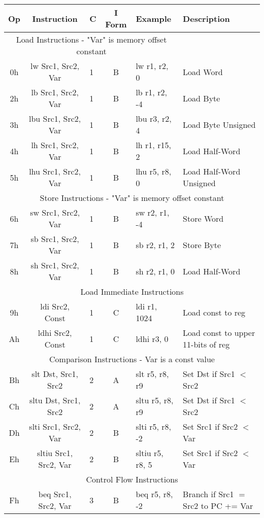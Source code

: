 \documentclass[]{article}
\begin{document}
\begin{longtable}{|c|c|l|c|l|p{5cm}|}
	\hline
	Op & Instruction & C & I Form & Example & Description \\
	\hline
	\multicolumn{5}{|c|}{Load Instructions - "Var" is memory offset constant} \\
	\hline
	0h & lw Src1, Src2, Var & 1 & B & lw r1, r2, 0 & Load Word \\
	\hline
	2h & lb Src1, Src2, Var & 1 & B & lb r1, r2, -4 & Load Byte\\
	\hline
	3h & lbu Src1, Src2, Var & 1 & B & lbu r3, r2, 4 & Load Byte Unsigned \\
	\hline
	4h & lh Src1, Src2, Var & 1 & B & lh r1, r15, 2 & Load Half-Word \\
	\hline
	5h & lhu Src1, Src2, Var & 1 & B & lhu r5, r8, 0 & Load Half-Word Unsigned \\
	\hline
	\multicolumn{6}{|c|}{Store Instructions - "Var" is memory offset constant} \\
	\hline
	6h & sw Src1, Src2, Var & 1 & B & sw r2, r1, -4 & Store Word \\
	\hline
	7h & sb Src1, Src2, Var & 1 & B & sb r2, r1, 2 & Store Byte \\
	\hline
	8h & sh Src1, Src2, Var & 1 & B & sh r2, r1, 0 & Load Half-Word \\
	\hline
	\multicolumn{6}{|c|}{Load Immediate Instructions} \\
	\hline
	9h & ldi Src2, Const & 1 & C & ldi r1, 1024 & Load const to reg \\
	\hline
	Ah & ldhi Src2, Const & 1 & C & ldhi r3, 0 & Load const to upper 11-bits of reg \\
	\hline
	\multicolumn{6}{|c|}{Comparison Instructions - Var is a const value} \\
	\hline
	Bh & slt Dst, Src1, Src2 & 2 & A & slt r5, r8, r9 & Set Dst if Src1 $<$ Src2 \\
	\hline
	Ch & sltu Dst, Src1, Src2 & 2 & A & sltu r5, r8, r9 & Set Dst if Src1 $<$ Src2 \\
	\hline
	Dh & slti Src1, Src2, Var & 2 & B & slti r5, r8, -2 & Set Src1 if Src2 $<$ Var \\
	\hline
	Eh & sltiu Src1, Src2, Var & 2 & B & sltiu r5, r8, 5 & Set Src1 if Src2 $<$ Var \\
	\multicolumn{6}{|c|}{Control Flow Instructions} \\
	\hline
	Fh & beq Src1, Src2, Var & 3 & B & beq r5, r8, -2 & Branch if Src1 $=$ Src2 to PC += Var \\
	\hline

\end{longtable}
\end{document}
